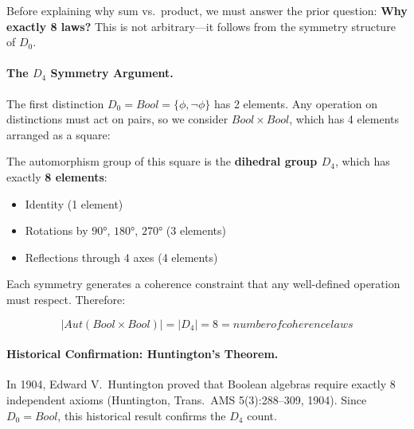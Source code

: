 \documentclass[11pt,a4paper]{book}
\def\text#1{#1}%
\begin{document}
Before explaining why sum vs.\ product, we must answer the prior question:
\textbf{Why exactly 8 laws?} This is not arbitrary---it follows from the 
symmetry structure of $D_0$.

\paragraph{The $D_4$ Symmetry Argument.}

The first distinction $D_0 = \text{Bool} = \{\phi, \neg\phi\}$ has 2 elements.
Any operation on distinctions must act on pairs, so we consider 
$\text{Bool} \times \text{Bool}$, which has 4 elements arranged as a square:

\begin{center}
\end{center}

The automorphism group of this square is the \textbf{dihedral group $D_4$}, 
which has exactly \textbf{8 elements}:
\begin{itemize}
\item Identity (1 element)
\item Rotations by $90°$, $180°$, $270°$ (3 elements)
\item Reflections through 4 axes (4 elements)
\end{itemize}

Each symmetry generates a coherence constraint that any well-defined 
operation must respect. Therefore:

$$|\text{Aut}(\text{Bool} \times \text{Bool})| = |D_4| = 8 = \text{number of coherence laws}$$

\paragraph{Historical Confirmation: Huntington's Theorem.}

In 1904, Edward V.\ Huntington proved that Boolean algebras require exactly 
8 independent axioms (Huntington, Trans.\ AMS 5(3):288--309, 1904). Since 
$D_0 = \text{Bool}$, this historical result confirms the $D_4$ count.
\end{document}

